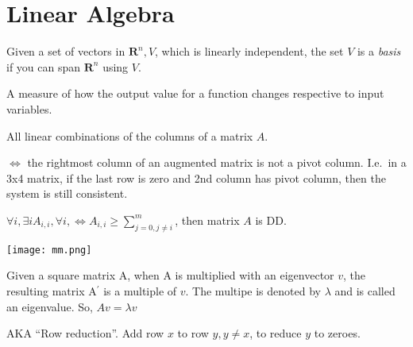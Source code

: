 \section{Linear Algebra}

\begin{definition}[Basis]
    Given a set of vectors in $\mathbf{R}^{n}, V$, which is linearly
    independent, the set $V$ is a \textit{basis} if you can span 
    $\mathbf{R}^{n}$ using $V$.
\end{definition}

\begin{definition}
    A measure of how the output value for a function changes respective to 
    input variables.
\end{definition}

\begin{definition}
    All linear combinations of the columns of a matrix $A$.
\end{definition}

\begin{definition}[Consistent]
    $\iff$ the rightmost column of an augmented matrix is not a pivot column.
    I.e.\ in a 3x4 matrix, if the last row is zero and 2nd column has pivot
    column, then the system is still consistent.
\end{definition}

\begin{definition}
    $\forall{i}, \exists{i} A_{i, i}, \forall i, \iff A_{i,i} 
    \geq \sum\limits_{j = 0, j\neq i}^{m}$,
    then matrix $A$ is DD.
\end{definition}

\begin{definition}
    \texttt{[image: mm.png]}
\end{definition}

\begin{definition}[Eigenvector]\label{eigen}
    Given a square matrix A, when A is multiplied with an eigenvector $v$,
    the resulting matrix A${^\prime}$ is a multiple of $v$.
    The multipe is denoted by $\lambda$ and is called an eigenvalue.
    So, $Av = \lambda v$

\end{definition}

\begin{definition}
    AKA ``Row reduction''. Add row $x$ to row $y, y \neq x$, to reduce $y$ to 
    zeroes.

\end{definition}


